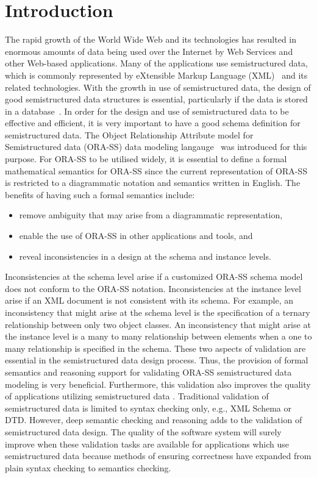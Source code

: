 \documentclass{entcs}
\begin{document}
\section{Introduction}\label{intro}
The rapid growth of the World Wide Web and its technologies has
resulted in enormous amounts of data being used over the Internet
by Web Services and other Web-based applications. Many of the
applications use semistructured data, which is commonly
represented by eXtensible Markup Language (XML)~\cite{xml} and its
related technologies. With the growth in use of semistructured
data, the design of good semistructured data structures is
essential, particularly if the data is stored in a
database~\cite{wu01}. In order for the design and use of
semistructured data to be effective and efficient, it is very
important to have a good schema definition for semistructured
data. The Object Relationship Attribute model for Semistructured
data (ORA-SS) data modeling langauge~\cite{dobbie01orass} was
introduced for this purpose. For ORA-SS to be utilised widely, it
is essential to define a formal mathematical semantics for ORA-SS
since the current representation of ORA-SS is restricted to a
diagrammatic notation and semantics written in English. The
benefits of having such a formal semantics include:
\begin{itemize}
\item remove ambiguity that may arise from a diagrammatic
representation, \item enable the use of ORA-SS in other
applications and tools, and \item reveal inconsistencies in a
design at the schema and instance levels.
\end{itemize}
Inconsistencies at the schema level arise if a customized ORA-SS
schema model does not conform to the ORA-SS notation.
Inconsistencies at the instance level arise if an XML document is
not consistent with its schema. For example, an inconsistency that
might arise at the schema level is the specification of a ternary
relationship between only two object classes. An inconsistency
that might arise at the instance level is a many to many
relationship between elements when a one to many relationship is
specified in the schema. These two aspects of validation are
essential in the semistructured data design process. Thus, the
provision of formal semantics and reasoning support for validating
ORA-SS semistructured data modeling is very beneficial.
Furthermore, this validation also improves the quality
of applications utilizing semistructured data%
. Traditional validation of semistructured data is limited to
syntax checking only, e.g., XML Schema or DTD. However, deep
semantic checking and reasoning adds to the validation of
semistructured data design. The quality of the software system
will surely improve when these validation tasks are available for
applications which use semistructured data because methods of
ensuring correctness have expanded from plain syntax checking to
semantics checking.
\end{document}
